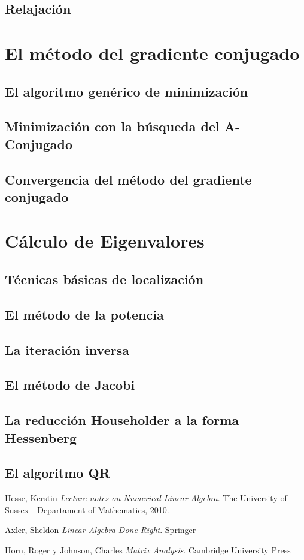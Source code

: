 \documentclass[12pt]{book}
\begin{document}
\section{Relajación}
\chapter{El método del gradiente conjugado}
\section{El algoritmo genérico de minimización}
\section{Minimización con la búsqueda del A-Conjugado}
\section{Convergencia del método del gradiente conjugado}
\chapter{Cálculo de Eigenvalores}
\section{Técnicas básicas de localización}
\section{El método de la potencia}
\section{La iteración inversa}
\section{El método de Jacobi}
\section{La reducción Householder a la forma Hessenberg}
\section{El algoritmo QR}
\begin{thebibliography}{9}
Hesse, Kerstin
\textit{Lecture notes on Numerical Linear Algebra}. 
The University of Sussex - Departament of Mathematics, 2010.

Axler, Sheldon
\textit{Linear Algebra Done Right}. 
Springer

Horn, Roger y Johnson, Charles
\textit{Matrix Analysis}. 
Cambridge University Press
\end{thebibliography}
\end{document}
